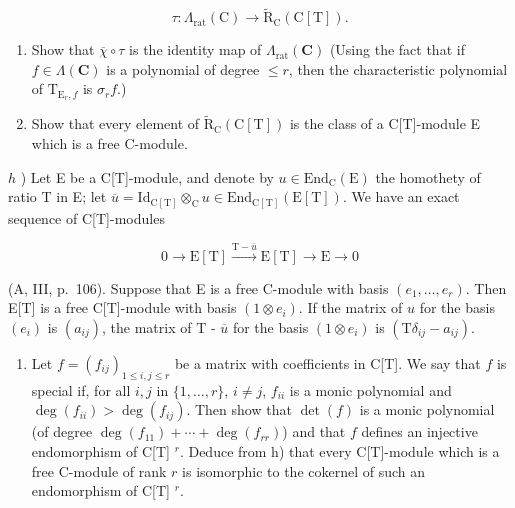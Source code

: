 \[
\tau : \Lambda_ {\mathrm{rat}} (\mathrm{C}) \rightarrow \tilde {\mathrm{R}} _ {\mathrm{C}} (\mathrm{C} [ \mathrm{T} ]).
\]

\begin{enumerate}
\def\labelenumi{\alph{enumi})}
\setcounter{enumi}{5}
\tightlist
\item
  Show that \(\overline{\chi} \circ \tau\) is the identity map of \(\Lambda_{\mathrm{rat}}(\mathbf{C})\) (Using the fact that if \(f \in \Lambda(\mathbf{C})\) is a polynomial of degree \(\leqslant r\), then the characteristic polynomial of \(\mathrm{T}_{\mathrm{E}_r,f}\) is \(\sigma_r f\).)
\item
  Show that every element of \(\tilde{\mathrm{R}}_{\mathrm{C}}(\mathrm{C}[\mathrm{T}])\) is the class of a C{[}T{]}-module E which is a free C-module.
\end{enumerate}

\(h\) ) Let E be a C{[}T{]}-module, and denote by \(u\in \mathrm{End}_{\mathrm{C}}(\mathrm{E})\) the homothety of ratio T in E; let \(\overline{u} = \mathrm{Id}_{\mathrm{C[T]}}\otimes_{\mathrm{C}}u\in \mathrm{End}_{\mathrm{C[T]}}(\mathrm{E}[\mathrm{T}])\). We have an exact sequence of C{[}T{]}-modules

\[
0 \longrightarrow \mathrm{E} [ \mathrm{T} ] \xrightarrow {\mathrm{T} - \bar {u}} \mathrm{E} [ \mathrm{T} ] \longrightarrow \mathrm{E} \longrightarrow 0
\]

(A, III, p.~106). Suppose that E is a free C-module with basis \((e_1, \ldots, e_r)\). Then E{[}T{]} is a free C{[}T{]}-module with basis \((1 \otimes e_i)\). If the matrix of \(u\) for the basis \((e_i)\) is \((a_{ij})\), the matrix of T - \(\overline{u}\) for the basis \((1 \otimes e_i)\) is \((\mathrm{T}\delta_{ij} - a_{ij})\).

\begin{enumerate}
\def\labelenumi{\roman{enumi})}
\tightlist
\item
  Let \(f = (f_{ij})_{1 \leqslant i,j \leqslant r}\) be a matrix with coefficients in C{[}T{]}. We say that \(f\) is special if, for all \(i, j\) in \(\{1, \dots, r\}\), \(i \neq j\), \(f_{ii}\) is a monic polynomial and \(\deg(f_{ii}) > \deg(f_{ij})\). Then show that \(\det(f)\) is a monic polynomial (of degree \(\deg(f_{11}) + \cdots + \deg(f_{rr})\)) and that \(f\) defines an injective endomorphism of C{[}T{]} \(^r\). Deduce from h) that every C{[}T{]}-module which is a free C-module of rank \(r\) is isomorphic to the cokernel of such an endomorphism of C{[}T{]} \(^r\).
\end{enumerate}

